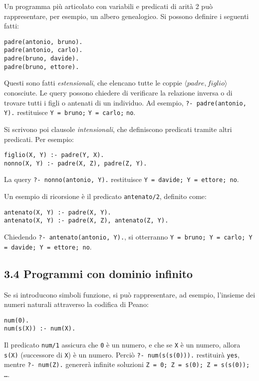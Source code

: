 \documentclass[12pt]{article}
\begin{document}
Un programma più articolato con variabili e predicati di arità 2 può rappresentare, per esempio, un albero genealogico. Si possono definire i seguenti fatti:
\begin{verbatim}
padre(antonio, bruno).
padre(antonio, carlo).
padre(bruno, davide).
padre(bruno, ettore).
\end{verbatim}
Questi sono fatti \emph{estensionali}, che elencano tutte le coppie $\langle padre, figlio\rangle$ conosciute. Le query possono chiedere di verificare la relazione inversa o di trovare tutti i figli o antenati di un individuo. Ad esempio, \texttt{?- padre(antonio, Y).} restituisce \texttt{Y = bruno;} \texttt{Y = carlo;} \texttt{no}.

Si scrivono poi clausole \emph{intensionali}, che definiscono predicati tramite altri predicati. Per esempio:
\begin{verbatim}
figlio(X, Y) :- padre(Y, X).
nonno(X, Y) :- padre(X, Z), padre(Z, Y).
\end{verbatim}
La query \texttt{?- nonno(antonio, Y).} restituisce \texttt{Y = davide; Y = ettore; no}.

Un esempio di ricorsione è il predicato \texttt{antenato/2}, definito come:
\begin{verbatim}
antenato(X, Y) :- padre(X, Y).
antenato(X, Y) :- padre(X, Z), antenato(Z, Y).
\end{verbatim}
Chiedendo \texttt{?- antenato(antonio, Y).}, si otterranno \texttt{Y = bruno; Y = carlo; Y = davide; Y = ettore; no}.

\subsection*{3.4 Programmi con dominio infinito}

Se si introducono simboli funzione, si può rappresentare, ad esempio, l'insieme dei numeri naturali attraverso la codifica di Peano:
\begin{verbatim}
num(0).
num(s(X)) :- num(X).
\end{verbatim}
Il predicato \texttt{num/1} assicura che \texttt{0} è un numero, e che se \texttt{X} è un numero, allora \texttt{s(X)} (successore di \texttt{X}) è un numero. Perciò \texttt{?- num(s(s(0))).} restituirà \texttt{yes}, mentre \texttt{?- num(Z).} genererà infinite soluzioni \texttt{Z = 0; Z = s(0); Z = s(s(0)); \dots}.
\end{document}
